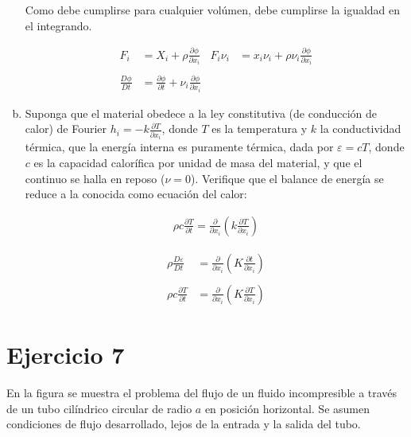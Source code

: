 \documentclass[a4paper,10pt,twoside,final,spanish]{article}
\begin{document}
\begin{enumerate}[a.]
\begin{tcolorbox}[colback=gray!10!white,colframe=black!0!white]
Como debe cumplirse para cualquier volúmen, debe cumplirse la igualdad en el integrando.

\begin{align*}
F_{i} &= X_{i}+\rho\frac{\partial\phi}{\partial x_{i}}
& F_{i}\nu_{i} &= x_{i}\nu_{i}+\rho\nu_{i}\frac{\partial\phi}{\partial x_{i}} \\ \\
\frac{D\phi}{Dt} &= \frac{\partial\phi}{\partial t}
+\nu_{i}\frac{\partial\phi}{\partial x_{i}}
& 
\end{align*}

\end{tcolorbox}

\item Suponga que el material obedece a la ley constitutiva (de conducción de calor) de Fourier $\displaystyle h_{i}=-k\frac{\partial T}{\partial x_{i}}$, donde $T$ es la temperatura y $k$ la conductividad térmica, que la energía interna es puramente  térmica, dada por $\varepsilon=cT$, donde $c$ es la capacidad calorífica por unidad de masa del material, y que el continuo se halla en reposo ($\nu=0$). Verifique que el balance de energía se reduce a la conocida como ecuación del calor:

\begin{align*}
\rho c\frac{\partial T}{\partial t}=\frac{\partial}{\partial x_{i}}\left(k\frac{\partial T}{\partial x_{i}}\right)
\end{align*}

\begin{tcolorbox}[colback=gray!10!white,colframe=black!0!white]

\begin{align*}
\rho\frac{D\varepsilon}{Dt} &= \frac{\partial}{\partial x_{i}}\left(
K\frac{\partial t}{\partial x_{i}}\right) \\ \\
\rho c\frac{\partial T}{\partial t} &= \frac{\partial}{\partial x_{i}}\left(
K\frac{\partial T}{\partial x_{i}}\right)
\end{align*}

\end{tcolorbox}

\end{enumerate}

\section*{Ejercicio 7}

En la figura se muestra el problema del flujo de un fluido incompresible a través de un tubo cilíndrico circular de radio $a$ en posición horizontal. Se asumen condiciones de flujo desarrollado, lejos de la entrada y la salida del tubo.
\end{document}
